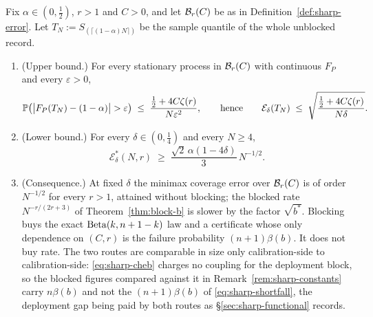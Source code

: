 \documentclass[../../../main.tex]{subfiles}
\begin{document}
\begin{theorem}\label{thm:block-rate}
Fix $\alpha\in(0,\tfrac12)$, $r>1$ and $C>0$, and let $\mathcal B_{r}(C)$ be as in Definition~\ref{def:sharp-error}. Let $T_N:=S_{(\lceil(1-\alpha)N\rceil)}$ be the sample quantile of the whole unblocked record.
\begin{enumerate}[nosep,label=(\alph*)]
\item (Upper bound.) For every stationary process in $\mathcal B_{r}(C)$ with continuous $F_P$ and every $\varepsilon>0$,
\begin{equation}\label{eq:sharp-cheb}
\Prob\big(\big|F_P(T_N)-(1-\alpha)\big|>\varepsilon\big)\;\le\;\frac{\tfrac12+4C\zeta(r)}{N\varepsilon^2},
\qquad\text{hence}\qquad
\mathcal E_\delta(T_N)\;\le\;\sqrt{\frac{\tfrac12+4C\zeta(r)}{N\delta}} .
\end{equation}
\item (Lower bound.) For every $\delta\in(0,\tfrac14)$ and every $N\ge4$,
\begin{equation}\label{eq:sharp-twopoint}
\mathcal E^*_\delta(N,r)\;\ge\;\frac{\sqrt2\,\alpha(1-4\delta)}{3}\,N^{-1/2} .
\end{equation}
\item (Consequence.) At fixed $\delta$ the minimax coverage error over $\mathcal B_{r}(C)$ is of order $N^{-1/2}$ for every $r>1$, attained without blocking; the blocked rate $N^{-r/(2r+3)}$ of Theorem~\ref{thm:block-b} is slower by the factor $\sqrt{b^*}$. Blocking buys the exact $\operatorname{Beta}(k,n+1-k)$ law and a certificate whose only dependence on $(C,r)$ is the failure probability $(n+1)\beta(b)$. It does not buy rate. The two routes are comparable in size only calibration-side to calibration-side: \eqref{eq:sharp-cheb} charges no coupling for the deployment block, so the blocked figures compared against it in Remark~\ref{rem:sharp-constants} carry $n\beta(b)$ and not the $(n+1)\beta(b)$ of \eqref{eq:sharp-shortfall}, the deployment gap being paid by both routes as \S\ref{sec:sharp-functional} records.
\end{enumerate}
\end{theorem}
\end{document}
